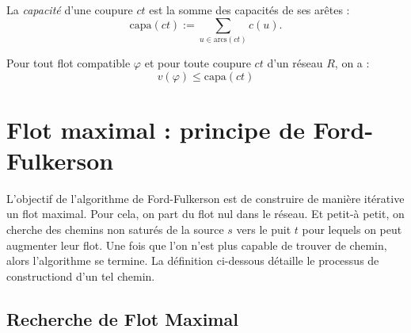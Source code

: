 \begin{definition}
    La \emph{capacité} d'une coupure $ct$ est la somme des capacités de ses arêtes :
    \[
        \mathrm{capa}(ct) := \sum_{u \in \mathrm{arcs}(ct)} c(u).
    \]
\end{definition}

\begin{theorem}
    Pour tout flot compatible $ \varphi$ et pour toute coupure $ct$ d'un réseau $R$, on a : 
        $$ v( \varphi) \leqslant \mathrm{capa}(ct) $$ 
\end{theorem}



\section{Flot maximal : principe de Ford-Fulkerson}

L'objectif de l'algorithme de Ford-Fulkerson est de construire de manière itérative un flot maximal. 
Pour cela, on part du flot nul dans le réseau. Et petit-à petit, on cherche des chemins non saturés de la source 
$s$ vers le puit $t$ pour lequels on peut augmenter leur flot. Une fois que l'on n'est plus capable de trouver 
de chemin, alors l'algorithme se termine. 
La définition ci-dessous détaille le processus de constructiond d'un tel chemin. 

\subsection{Recherche de Flot Maximal}

